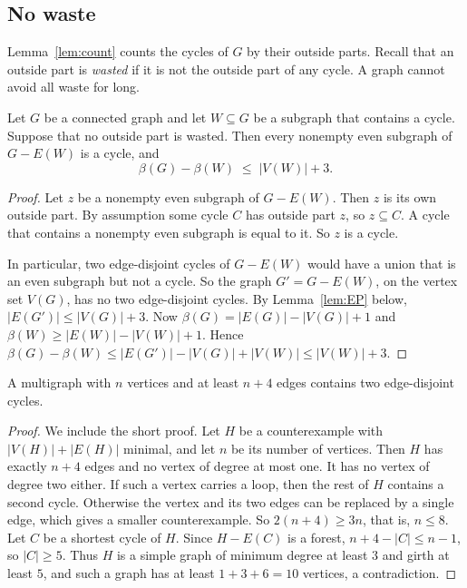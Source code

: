 \subsection{No waste}

Lemma~\ref{lem:count} counts the cycles of $G$ by their outside parts. Recall that an outside
part is \emph{wasted} if it is not the outside part of any cycle. A graph cannot avoid all waste
for long.

\begin{proposition}\label{prop:nowaste}
Let $G$ be a connected graph and let $W\subseteq G$ be a subgraph that contains a cycle. Suppose
that no outside part is wasted. Then every nonempty even subgraph of $G-E(W)$ is a cycle, and
\[
  \beta(G)-\beta(W)\;\le\;|V(W)|+3 .
\]
\end{proposition}

\begin{proof}
Let $z$ be a nonempty even subgraph of $G-E(W)$. Then $z$ is its own outside part. By assumption
some cycle $C$ has outside part $z$, so $z\subseteq C$. A cycle that contains a nonempty even
subgraph is equal to it. So $z$ is a cycle.

In particular, two edge-disjoint cycles of $G-E(W)$ would have a union that is an even subgraph but
not a cycle. So the graph $G'=G-E(W)$, on the vertex set $V(G)$, has no two edge-disjoint cycles.
By Lemma~\ref{lem:EP} below, $|E(G')|\le|V(G)|+3$. Now $\beta(G)=|E(G)|-|V(G)|+1$ and
$\beta(W)\ge|E(W)|-|V(W)|+1$. Hence
$\beta(G)-\beta(W)\le|E(G')|-|V(G)|+|V(W)|\le|V(W)|+3$.
\end{proof}

\begin{lemma}\label{lem:EP}
A multigraph with $n$ vertices and at least $n+4$ edges contains two edge-disjoint cycles.
\end{lemma}

\begin{proof}
We include the short proof. Let $H$ be a counterexample with $|V(H)|+|E(H)|$ minimal, and let $n$
be its number of vertices. Then $H$ has exactly $n+4$ edges and no vertex of degree at most one. It
has no vertex of degree two either. If such a vertex carries a loop, then the rest of $H$ contains a
second cycle. Otherwise the vertex and its two edges can be replaced by a single edge, which gives a
smaller counterexample. So
$2(n+4)\ge3n$, that is, $n\le8$. Let $C$ be a shortest cycle of $H$. Since $H-E(C)$ is a forest,
$n+4-|C|\le n-1$, so $|C|\ge5$. Thus $H$ is a simple graph of minimum degree at least $3$ and girth
at least $5$, and such a graph has at least $1+3+6=10$ vertices, a contradiction.
\end{proof}

